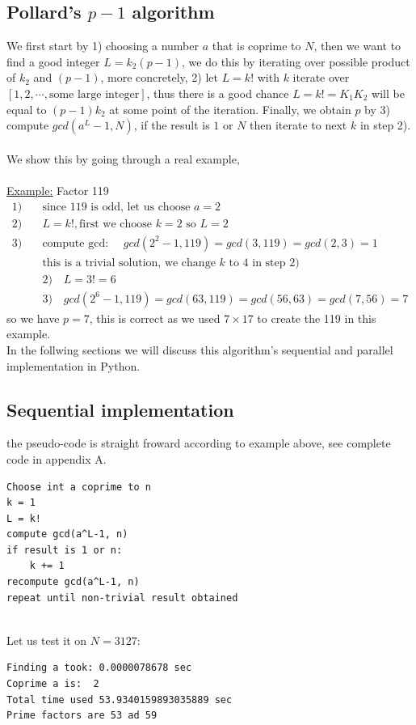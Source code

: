 \documentclass[10pt]{article}
\begin{document}
\subsection{Pollard's $p-1$ algorithm\cite{suzuki}}
We first start by 1) choosing a number $a$ that is coprime to $N$, then we want to find a good integer $L=k_2(p-1)$, we do this by iterating over possible product of $k_2$ and $(p-1)$, more concretely, 2) let $L= k!$ with $k$ iterate over $[1, 2, \cdots, \text{some large integer}]$, thus there is a good chance $L=k!=K_1K_2$ will be equal to $(p-1)k_2$ at some point of the iteration. Finally, we obtain $p$ by 3) compute $gcd(a^L-1, N)$, if the result is $1$ or $N$ then iterate to next $k$ in step 2).\\
\-\ \\
We show this by going through a real example,\\
\-\ \\
\underline{Example:} Factor 119\\
\begin{align*}
1)& \quad \text{since 119 is odd, let us choose $a=2$}\\
2)& \quad L=k!, \text{first we choose $k=2$ so $L=2$}\\
3)& \quad \text{compute gcd: }\quad gcd(2^2-1, 119) = gcd(3,119) = gcd(2,3) = 1\\
&\quad \text{this is a trivial solution, we change $k$ to $4$ in step 2)}\\
&\quad 2) \quad L = 3! = 6\\
&\quad 3) \quad gcd(2^6-1, 119)=gcd(63, 119)=gcd(56,63)=gcd(7,56)=7
\end{align*}
so we have $p=7$, this is correct as we used $7\times17$ to create the 119 in this example.\\
In the follwing sections we will discuss this algorithm's sequential and parallel implementation in Python. 
\subsection{Sequential implementation}
the pseudo-code is straight froward according to example above, see complete code in appendix A.
\begin{verbatim}
Choose int a coprime to n
k = 1
L = k!
compute gcd(a^L-1, n)
if result is 1 or n:
    k += 1
recompute gcd(a^L-1, n)
repeat until non-trivial result obtained
\end{verbatim}
\-\ \\
Let us test it on $N=3127$:
\begin{verbatim}
Finding a took: 0.0000078678 sec
Coprime a is:  2
Total time used 53.9340159893035889 sec
Prime factors are 53 ad 59
\end{verbatim}
\end{document}
